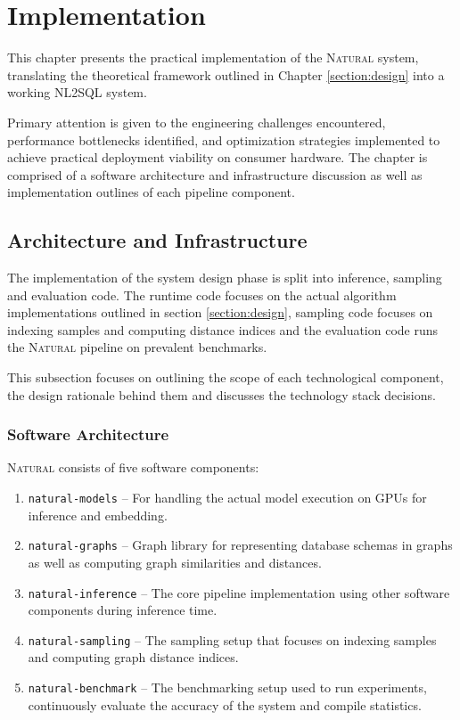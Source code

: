 \section{Implementation}

This chapter presents the practical implementation of the \textsc{Natural}
system, translating the theoretical framework outlined in Chapter
\ref{section:design} into a working NL2SQL system.

Primary attention is given to the engineering challenges encountered,
performance bottlenecks identified, and optimization strategies implemented to
achieve practical deployment viability on consumer hardware.
The chapter is comprised of a software architecture and infrastructure
discussion as well as implementation outlines of each pipeline component.

\subsection{Architecture and Infrastructure}

The implementation of the system design phase is split into inference, sampling
and evaluation code. The runtime code focuses on the actual algorithm
implementations outlined in section \ref{section:design}, sampling code focuses on
indexing samples and computing distance indices and the evaluation code runs
the \textsc{Natural} pipeline on prevalent benchmarks.

This subsection focuses on outlining the scope of each technological component,
the design rationale behind them and discusses the technology stack
decisions.

\subsubsection{Software Architecture}

\textsc{Natural} consists of five software components:

\begin{enumerate}
    \item \texttt{natural-models} – For handling the actual model
        execution on GPUs for inference and embedding.
    \item \texttt{natural-graphs} – Graph library for representing
        database schemas in graphs as well as computing graph similarities and
        distances.
    \item \texttt{natural-inference} – The core pipeline implementation using
        other software components during inference time.
    \item \texttt{natural-sampling} – The sampling setup that focuses on
        indexing samples and computing graph distance indices.
    \item \texttt{natural-benchmark} – The benchmarking setup used to run
        experiments, continuously evaluate the accuracy of the system and
        compile statistics.
\end{enumerate}

